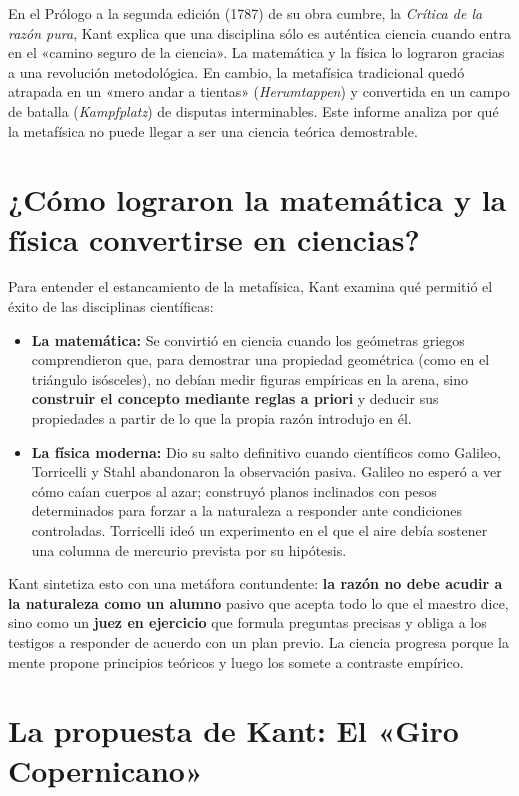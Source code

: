 \documentclass[a4paper, 11pt]{article}
\begin{document}
En el Prólogo a la segunda edición (1787) de su obra cumbre, la \textit{Crítica de la razón pura}, Kant explica que una disciplina sólo es auténtica ciencia cuando entra en el «camino seguro de la ciencia». La matemática y la física lo lograron gracias a una revolución metodológica. En cambio, la metafísica tradicional quedó atrapada en un «mero andar a tientas» (\textit{Herumtappen}) y convertida en un campo de batalla (\textit{Kampfplatz}) de disputas interminables. Este informe analiza por qué la metafísica no puede llegar a ser una ciencia teórica demostrable.

\section{¿Cómo lograron la matemática y la física convertirse en ciencias?}

Para entender el estancamiento de la metafísica, Kant examina qué permitió el éxito de las disciplinas científicas:

\begin{itemize}
    \item \textbf{La matemática:} Se convirtió en ciencia cuando los geómetras griegos comprendieron que, para demostrar una propiedad geométrica (como en el triángulo isósceles), no debían medir figuras empíricas en la arena, sino \textbf{construir el concepto mediante reglas a priori} y deducir sus propiedades a partir de lo que la propia razón introdujo en él.
    
    \item \textbf{La física moderna:} Dio su salto definitivo cuando científicos como Galileo, Torricelli y Stahl abandonaron la observación pasiva. Galileo no esperó a ver cómo caían cuerpos al azar; construyó planos inclinados con pesos determinados para forzar a la naturaleza a responder ante condiciones controladas. Torricelli ideó un experimento en el que el aire debía sostener una columna de mercurio prevista por su hipótesis.
\end{itemize}

Kant sintetiza esto con una metáfora contundente: \textbf{la razón no debe acudir a la naturaleza como un alumno} pasivo que acepta todo lo que el maestro dice, sino como un \textbf{juez en ejercicio} que formula preguntas precisas y obliga a los testigos a responder de acuerdo con un plan previo. La ciencia progresa porque la mente propone principios teóricos y luego los somete a contraste empírico.

\section{La propuesta de Kant: El «Giro Copernicano»}
\end{document}
